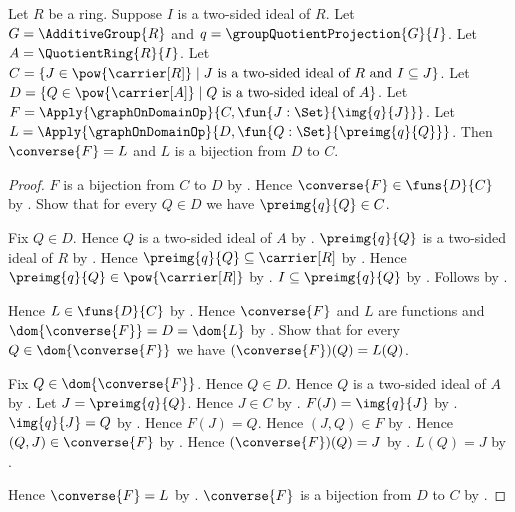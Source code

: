 \begin{theorem}\label{ring_ideal_correspondence_inverse_graph}
    Let $R$ be a ring.
    Suppose $I$ is a two-sided ideal of $R$.
    Let $G=\AdditiveGroup{R}$ and
        $q=\groupQuotientProjection{G}{I}$.
    Let $A=\QuotientRing{R}{I}$.
    Let
        $C=\{J\in\pow{\carrier[R]}\mid
            \text{$J$ is a two-sided ideal of $R$ and
                $I\subseteq J$}\}$.
    Let
        $D=\{Q\in\pow{\carrier[A]}\mid
            \text{$Q$ is a two-sided ideal of $A$}\}$.
    Let
        $F=\Apply{\graphOnDomainOp}
            {C,\fun{J:\Set}{\img{q}{J}}}$.
    Let
        $L=\Apply{\graphOnDomainOp}
            {D,\fun{Q:\Set}{\preimg{q}{Q}}}$.
    Then $\converse{F}=L$ and
        $L$ is a bijection from $D$ to $C$.
\end{theorem}
\begin{proof}
    $F$ is a bijection from $C$ to $D$ by
        .
    Hence $\converse{F}\in\funs{D}{C}$ by
        .
    Show that for every $Q\in D$ we have $\preimg{q}{Q}\in C$.
    \begin{subproof}
        Fix $Q\in D$.
        Hence $Q$ is a two-sided ideal of $A$ by \auto.
        $\preimg{q}{Q}$ is a two-sided ideal of $R$ by
            .
        Hence $\preimg{q}{Q}\subseteq\carrier[R]$ by
            .
        Hence $\preimg{q}{Q}\in\pow{\carrier[R]}$ by
            .
        $I\subseteq\preimg{q}{Q}$ by
            .
        Follows by \auto.
    \end{subproof}
    Hence $L\in\funs{D}{C}$ by
        .
    Hence $\converse{F}$ and $L$ are functions and
        $\dom{\converse{F}}=D=\dom{L}$ by
        .
    Show that for every $Q\in\dom{\converse{F}}$ we have
        $(\converse{F})(Q)=L(Q)$.
    \begin{subproof}
        Fix $Q\in\dom{\converse{F}}$.
        Hence $Q\in D$.
        Hence $Q$ is a two-sided ideal of $A$ by \auto.
        Let $J=\preimg{q}{Q}$.
        Hence $J\in C$ by \auto.
        $F(J)=\img{q}{J}$ by
            .
        $\img{q}{J}=Q$ by
            .
        Hence $F(J)=Q$.
        Hence $(J,Q)\in F$ by
            .
        Hence $(Q,J)\in\converse{F}$ by .
        Hence $(\converse{F})(Q)=J$ by
            .
        $L(Q)=J$ by .
    \end{subproof}
    Hence $\converse{F}=L$ by .
    $\converse{F}$ is a bijection from $D$ to $C$ by
        .
\end{proof}
